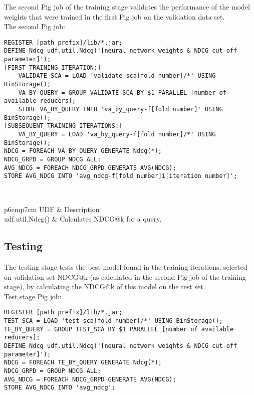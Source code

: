 The second Pig job of the training stage validates the performance of the model weights that were trained in the first Pig job on the validation data set.\\

The second Pig job:\\
\begin{minipage}{\linewidth}
\begin{lstlisting}
REGISTER [path prefix]/lib/*.jar;
DEFINE Ndcg udf.util.Ndcg('[neural network weights & NDCG cut-off parameter]');
[FIRST TRAINING ITERATION:]
	VALIDATE_SCA = LOAD 'validate_sca[fold number]/*' USING BinStorage();
	VA_BY_QUERY = GROUP VALIDATE_SCA BY $1 PARALLEL [number of available reducers];
	STORE VA_BY_QUERY INTO 'va_by_query-f[fold number]' USING BinStorage();
[SUBSEQUENT TRAINING ITERATIONS:]
	VA_BY_QUERY = LOAD 'va_by_query-f[fold number]/*' USING BinStorage();
NDCG = FOREACH VA_BY_QUERY GENERATE Ndcg(*);
NDCG_GRPD = GROUP NDCG ALL;
AVG_NDCG = FOREACH NDCG_GRPD GENERATE AVG(NDCG);
STORE AVG_NDCG INTO 'avg_ndcg-f[fold number]i[iteration number]';
\end{lstlisting}
\end{minipage}\\

\begin{table}
\centering
\begin{tabular}{p{6cm}p{7cm}}\toprule
UDF & Description \\
\midrule
udf.util.Ndcg() & Calculates \ac{NDCG}@k for a query.\\
\bottomrule
\end{tabular}
\caption{Description of training phase User Defined Functions (Pig job 2)}
\label{tbl:training_udfs_2}
\end{table}

\subsection{Testing}
The testing stage tests the best model found in the training iterations, selected on validation set \ac{NDCG}@k (as calculated in the second Pig job of the training stage), by calculating the \ac{NDCG}@k of this model on the test set.\\

Test stage Pig job:\\
\begin{minipage}{\linewidth}
\begin{lstlisting}
REGISTER [path prefix]/lib/*.jar;
TEST_SCA = LOAD 'test_sca[fold number]/*' USING BinStorage();
TE_BY_QUERY = GROUP TEST_SCA BY $1 PARALLEL [number of available reducers];
DEFINE Ndcg udf.util.Ndcg('[neural network weights & NDCG cut-off parameter]');
NDCG = FOREACH TE_BY_QUERY GENERATE Ndcg(*);
NDCG_GRPD = GROUP NDCG ALL;
AVG_NDCG = FOREACH NDCG_GRPD GENERATE AVG(NDCG);
STORE AVG_NDCG INTO 'avg_ndcg';
\end{lstlisting}
\end{minipage}\\

